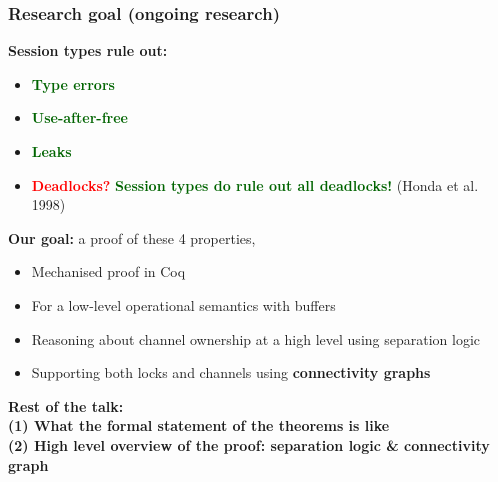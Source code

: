 \documentclass[aspectratio=169]{beamer}
\newcommand{\remph}[1] {\textcolor{red}{\textbf{#1}}}
\newcommand{\gemph}[1] {\textcolor{darkgreen}{\textbf{#1}}}
\begin{document}
\begin{frame}[fragile]
  \frametitle{Research goal (ongoing research)}

  \textbf{Session types rule out:}
  \begin{itemize}
    \item \gemph{Type errors}
    \item \gemph{Use-after-free}
    \item \gemph{Leaks}
    \item \remph{Deadlocks?}
    \gemph{Session types do rule out all deadlocks!} (Honda et al. 1998)
  \end{itemize}
  \bigskip

  \textbf{Our goal:} a proof of these 4 properties,
  \begin{itemize}
    \item Mechanised proof in Coq
    \item For a low-level operational semantics with buffers
    \item Reasoning about channel ownership at a high level using separation logic
    \item Supporting both locks and channels using \textbf{connectivity graphs}
  \end{itemize}

  \bigskip
  \textbf{Rest of the talk: \\ (1) What the formal statement of the theorems is like \\(2) High level overview of the proof: separation logic \& connectivity graph}
\end{frame}
\end{document}
